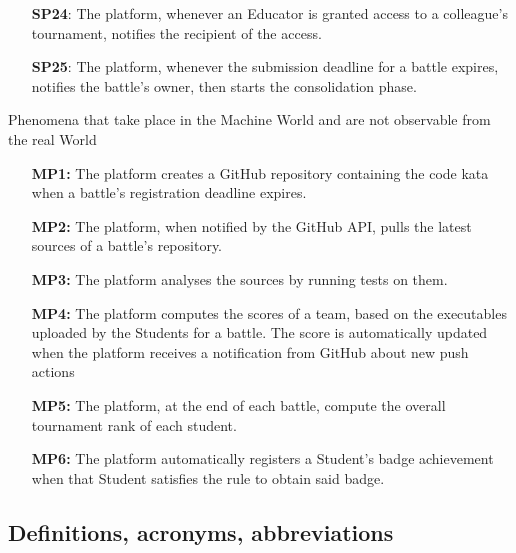 \documentclass{article}
\newcounter{subsubsubsection}[subsubsection]
\begin{document}
\begin{itemize}
\begin{enumerate}
                    \begin{enumerate}
                        \item[\textbf{SP24}:] The platform, whenever an Educator is granted access to a colleague's tournament, notifies the recipient of the access.
                        \item[\textbf{SP25}:] The platform, whenever the submission deadline for a battle expires, notifies the battle's owner, then starts the
                         consolidation phase.
                    \end{enumerate}
          \end{enumerate}
\end{itemize}

Phenomena that take place in the Machine World and are not observable from the real World
\begin{enumerate}
    \item[\textbf{MP1:}] The platform creates a GitHub repository containing the code kata when a battle's registration deadline expires.
    \item[\textbf{MP2:}] The platform, when notified by the GitHub API, pulls the latest sources of a battle's repository.
    \item[\textbf{MP3:}] The platform analyses the sources by running tests on them.
    \item[\textbf{MP4:}] The platform computes the scores of a team, based on the executables uploaded by the Students for a battle. 
    The score is automatically updated when the platform receives a notification from GitHub about new push actions%
    \item[\textbf{MP5:}] The platform, at the end of each battle, compute the overall tournament rank of each student.
    \item[\textbf{MP6:}] The platform automatically registers a Student's badge achievement when that Student satisfies the rule to obtain said badge.
\end{enumerate}


\subsection{Definitions, acronyms, abbreviations}
\end{document}

